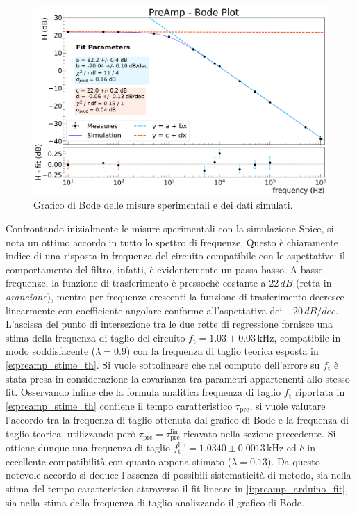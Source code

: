 \documentclass[a4paper,11pt]{article} %
\begin{document}
\begin{figure}[H]
	\centering
	\includegraphics[width=0.8\linewidth]{../Plots/PreAmp/bode_plot.png}
	\vspace{-10pt}
	\caption{\small Grafico di Bode delle misure sperimentali e dei dati simulati.}
	\label{i:preamp_thebode}
\end{figure}
\vspace{-7pt}
Confrontando inizialmente le misure sperimentali con la simulazione Spice, si nota un ottimo accordo in tutto lo spettro
di frequenze. Questo è chiaramente indice di una risposta in frequenza del circuito compatibile con le aspettative: il
comportamento del filtro, infatti, è evidentemente un passa basso. A basse frequenze, la funzione di trasferimento è
pressochè costante a $22\,\si{dB}$ (retta in \textit{arancione}), mentre per frequenze crescenti la funzione di
trasferimento decresce linearmente con coefficiente angolare conforme all'aspettativa dei $-20\,\si{dB/dec}$. L'ascissa
del punto di intersezione tra le due rette di regressione fornisce una stima della frequenza di taglio del circuito
$f_{\text{t}} = 1.03 \pm 0.03 \,\si{\kHz}$, compatibile in modo soddisfacente ($\lambda = 0.9$) con la frequenza di
taglio teorica esposta in \autoref{e:preamp_stime_th}. Si vuole sottolineare che nel computo dell'errore su
$f_{\text{t}}$ è stata presa in considerazione la covarianza tra parametri appartenenti allo stesso fit. Osservando
infine che la formula analitica frequenza di taglio $f_{\text{t}}$ riportata in \autoref{e:preamp_stime_th} contiene il
tempo caratteristico $\tau_{\text{pre}}$, si vuole valutare l'accordo tra la frequenza di taglio ottenuta dal grafico di
Bode e la frequenza di taglio teorica, utilizzando però $\tau_{\text{pre}}=\tau_{\text{pre}}^{\text{lin}}$ ricavato
nella sezione precedente. Si ottiene dunque una frequenza di taglio $f_{\text{t}}^{\text{lin}} = 1.0340 \pm 0.0013
\,\si{\kHz}$ ed è in eccellente compatibilità con quanto appena stimato ($\lambda = 0.13$). Da questo notevole accordo
si deduce l'assenza di possibili sistematicità di metodo, sia nella stima del tempo caratteristico attraverso il fit
lineare in \autoref{i:preamp_arduino_fit}, sia nella stima della frequenza di taglio analizzando il grafico di Bode. 
\end{document}
